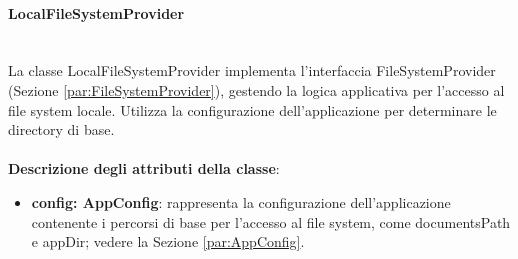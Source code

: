 \documentclass[a4paper,12pt]{article}
\begin{document}
{{{                \paragraph{LocalFileSystemProvider}\label{par:LocalFileSystemProvider}\mbox{}\\
                La classe LocalFileSystemProvider implementa l'interfaccia FileSystemProvider (Sezione \ref{par:FileSystemProvider}), gestendo la logica applicativa per l'accesso al file system locale. Utilizza la configurazione dell'applicazione per determinare le directory di base.\\
                \\
                \textbf{Descrizione degli attributi della classe}:
                \begin{itemize}
                    \item \textbf{config: AppConfig}: rappresenta la configurazione dell'applicazione contenente i percorsi di base per l'accesso al file system, come documentsPath e appDir; vedere la Sezione \ref{par:AppConfig}.
                \end{itemize}
                
}}}
\end{document}
